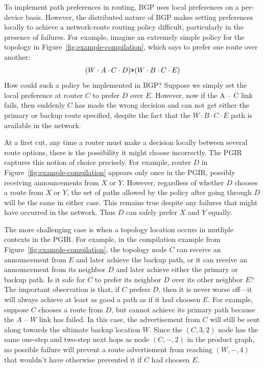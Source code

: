 
To implement path preferences in routing, BGP uses local preferences on a per-device basis. However, the distributed nature of BGP makes setting preferences locally to achieve a network-route routing policy difficult, particularly in the presence of failures. For example, imagine an extremely simple policy for the topology in Figure~\ref{fig:example-compilation}, which says to prefer one route over another:
%
$$(W \cdot A \cdot C \cdot D) \texttt{>>} (W \cdot B \cdot C \cdot E)$$
%
How could such a policy be implemented in BGP? Suppose we simply set the local preference at router $C$ to prefer $D$ over $E$. However, now if the A -- C link fails, then suddenly $C$ has made the wrong decision and can not get either the primary or backup route specified, despite the fact that the $W \cdot B \cdot C \cdot E$ path is available in the network.

At a first cut, any time a router must make a decision locally between several route options, there is the possibility it might choose incorrectly. The PGIR captures this notion of choice precisely. For example, router $D$ in Figure~\ref{fig:example-compilation} appears only once in the PGIR, possibly receiving announcements from $X$ or $Y$. However, regardless of whether $D$ chooses a route from $X$ or $Y$, the set of paths allowed by the policy after going through $D$ will be the same in either case. This remains true despite any failures that might have occurred in the network. Thus $D$ can safely prefer $X$ and $Y$ equally.

The more challenging case is when a topology location occurs in mutliple contexts in the PGIR. For example, in the compilation example from Figure~\ref{fig:example-compilation}, the topology node $C$ can receive an announcement from $E$ and later achieve the backup path, or it can receive an announcement from its neighbor $D$ and later achieve either the primary or backup path. Is it safe for $C$ to prefer its neighbor $D$ over its other neighbor $E$? The important observation is that, if $C$ prefers $D$, then it is never worse off---it will always achieve at least as good a path as if it had choosen $E$.
For example, suppose $C$ chooses a route from $D$, but cannot achieve its primary path because the $A$ -- $W$ link has failed. In this case, the advertisement from $C$ will still be sent along towards the ultimate backup location $W$. Since the $(C,3,2)$ node has the same one-step and two-step next hops as node $(C,-,2)$ in the product graph, no possible failure will prevent a route advertisment from reaching $(W,-,4)$ that wouldn't have otherwise prevented it if $C$ had choosen $E$.

